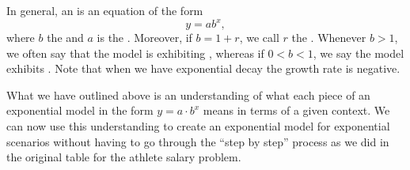 \documentclass{ximera}
\begin{document}
%
\begin{definition}
In general, an  is an equation of the form 
$$y = ab^x,$$ 
where $b$ the  and $a$ is the . 
Moreover, if $b = 1+r$, we call $r$ the . Whenever $b \gt 1$, we often say that the model is exhibiting , whereas if \(0 \lt b \lt 1\), we say the model exhibits .
Note that when we have exponential decay the growth rate is negative.
\end{definition}
%
What we have outlined above is an understanding of what each piece of an exponential model in the form $y=a\cdot b^x$ means in terms of a given context.  We can now use this understanding to create an exponential model for exponential scenarios without having to go through the ``step by step'' process as we did in the original table for the athlete salary problem.  
%
\end{document}
